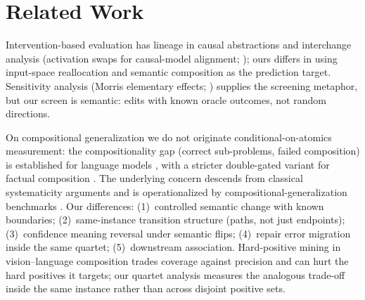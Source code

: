 \section{Related Work}
\label{sec:related}

Intervention-based evaluation has lineage in causal abstractions and
interchange analysis (activation swaps for causal-model alignment;
\citep{geiger2021causal}); ours differs in using input-space reallocation
and semantic composition as the prediction target. Sensitivity analysis
(Morris elementary effects; \citep{morris1991factorial}) supplies the
screening metaphor, but our screen is semantic: edits with known oracle
outcomes, not random directions.

On compositional generalization we do not originate conditional-on-atomics
measurement: the compositionality gap (correct sub-problems, failed
composition) is established for language models
\citep{press2023measuring}, with a stricter double-gated variant for
factual composition \citep{yu2026compositioncollapse}. The underlying
concern descends from classical systematicity arguments
\citep{fodor1988connectionism} and is operationalized by
compositional-generalization benchmarks
\citep{lake2018generalization,keysers2020measuring}. Our differences:
(1)~controlled semantic change with known boundaries;
(2)~same-instance transition structure (paths, not just endpoints);
(3)~confidence meaning reversal under semantic flips;
(4)~repair error migration inside the same quartet; (5)~downstream
association. Hard-positive mining in vision--language composition \citep{kamath2024hard} trades coverage against precision and can hurt the hard
positives it targets; our quartet analysis measures the analogous
trade-off inside the same instance rather than across disjoint positive
sets.

